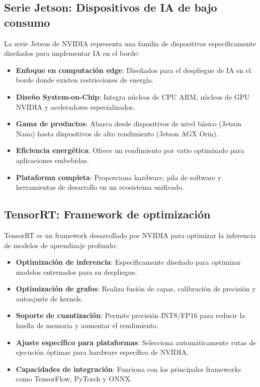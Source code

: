 \documentclass[11pt,spanish,listoffigures,listoftables]{tfgetsinf}
\begin{document}
\subsection{Serie Jetson: Dispositivos de IA de bajo consumo}
La serie Jetson de NVIDIA representa una familia de dispositivos específicamente diseñados para implementar IA en el borde:

\begin{itemize}
   \item \textbf{Enfoque en computación edge}: Diseñados para el despliegue de IA en el borde donde existen restricciones de energía.
   
   \item \textbf{Diseño System-on-Chip}: Integra núcleos de CPU ARM, núcleos de GPU NVIDIA y aceleradores especializados.
   
   \item \textbf{Gama de productos}: Abarca desde dispositivos de nivel básico (Jetson Nano) hasta dispositivos de alto rendimiento (Jetson AGX Orin).
   
   \item \textbf{Eficiencia energética}: Ofrece un rendimiento por vatio optimizado para aplicaciones embebidas.
   
   \item \textbf{Plataforma completa}: Proporciona hardware, pila de software y herramientas de desarrollo en un ecosistema unificado.
\end{itemize}

\subsection{TensorRT: Framework de optimización}
TensorRT es un framework desarrollado por NVIDIA para optimizar la inferencia de modelos de aprendizaje profundo:

\begin{itemize}
   \item \textbf{Optimización de inferencia}: Específicamente diseñado para optimizar modelos entrenados para su despliegue.
   
   \item \textbf{Optimización de grafos}: Realiza fusión de capas, calibración de precisión y autoajuste de kernels.
   
   \item \textbf{Soporte de cuantización}: Permite precisión INT8/FP16 para reducir la huella de memoria y aumentar el rendimiento.
   
   \item \textbf{Ajuste específico para plataformas}: Selecciona automáticamente rutas de ejecución óptimas para hardware específico de NVIDIA.
   
   \item \textbf{Capacidades de integración}: Funciona con los principales frameworks como TensorFlow, PyTorch y ONNX.
\end{itemize}
\end{document}
